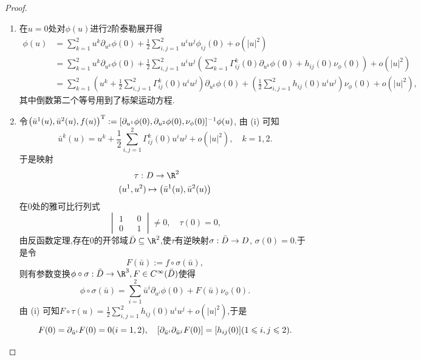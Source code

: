 	\begin{proof}
		\begin{enumerate}[label=(\roman*)]
			\item 在$u=0$处对$\phi(u)$进行$2$阶泰勒展开得
			\begin{align*}
				\phi(u)&=\sum_{k=1}^{2}u^{k}\partial_{u^{k}}\phi(0)+\frac{1}{2}\sum_{i,j=1}^{2}u^{i}u^{j}\phi_{ij}(0)+o(|u|^{2})\\
				&=\sum_{k=1}^{2}u^{k}\partial_{u^{k}}\phi(0)+\frac{1}{2}\sum_{i,j=1}^{2}u^{i}u^{j}\left(\sum_{k=1}^{2}\Gamma_{ij}^{k}(0)\partial_{u^{k}}\phi(0)+h_{ij}(0)\nu_{\phi}(0)\right)+o(|u|^{2})\\
				&=\sum_{k=1}^{2}\left( u^{k}+\frac{1}{2}\sum_{i,j=1}^{2}\Gamma_{ij}^{k}(0)u^{i}u^{j} \right)\partial_{u^{k}}\phi(0)+\left( \frac{1}{2}\sum_{i,j=1}^{2}h_{ij}(0)u^{i}u^{j} \right)\nu_{\phi}(0)+o(|u|^{2}),
			\end{align*}
			其中倒数第二个等号用到了标架运动方程.
			\item 令$\bigl(\bar{u}^{1}(u),\bar{u}^{2}(u),f(u)\bigr)^{\mathrm{T}}:=[\partial_{u^{1}}\phi(0),\partial_{u^{2}}\phi(0),\nu_{\phi}(0)]^{-1}\phi(u)$, 由 (i) 可知
			$$
			\bar{u}^{k}(u)=u^{k}+\frac{1}{2}\sum_{i,j=1}^{2}\Gamma_{ij}^{k}(0)u^{i}u^{j}+o(|u|^{2}),\quad k=1,2.
			$$
			于是映射
			\begin{align*}
				\tau:\ &D\to\R^{2}\\
					(u^{1},u^{2})&\mapsto\bigl(\bar{u}^{1}(u),\bar{u}^{2}(u)\bigr)
			\end{align*}
			在$0$处的雅可比行列式
			$$
			\begin{vmatrix}
				1&&0\\
				0&&1
			\end{vmatrix}\neq 0,\quad \tau(0)=0,
			$$
			由反函数定理,存在$0$的开邻域$\widebar{D}\subseteq\R^{2}$,使$\tau$有逆映射$\sigma:\bar{D}\to D$, $\sigma(0)=0$.于是令
			$$
			F(\bar{u}):=f\circ\sigma(\bar{u}),
			$$
			则有参数变换$\phi\circ\sigma:\widebar{D}\to\R^{3},F\in C^{\infty}(\widebar{D})$使得
			$$
			\phi\circ\sigma(\bar{u})=\sum_{i=1}^{2}\bar{u}^{i}\partial_{u^{i}}\phi(0)+F(\bar{u})\nu_{\phi}(0).
			$$
			由 (i) 可知$\displaystyle F\circ\tau(u)=\frac{1}{2}\sum_{i,j=1}^{2}h_{ij}(0)u^{i}u^{j}+o(|u|^{2})$,于是
			$$
			F(0)=\partial_{\bar{u}^{i}}F(0)=0(i=1,2),\quad [\partial_{\bar{u}^{i}}\partial_{\bar{u}^{j}}F(0)]=[h_{ij}(0)](1\leqslant i,j\leqslant 2).\qedhere
			$$
		\end{enumerate}
	\end{proof}

